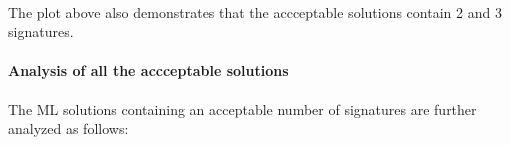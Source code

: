 \documentclass[11pt]{article}
\begin{document}
    \begin{center}
    \end{center}
    { \hspace*{\fill} \\}
    
    \begin{Verbatim}[commandchars=\\\{\}]

    \end{Verbatim}

    The plot above also demonstrates that the accceptable solutions contain
2 and 3 signatures.

\hypertarget{analysis-of-all-the-accceptable-solutions}{%
\paragraph{Analysis of all the accceptable
solutions}\label{analysis-of-all-the-accceptable-solutions}}

The ML solutions containing an acceptable number of signatures are
further analyzed as follows:
\end{document}
